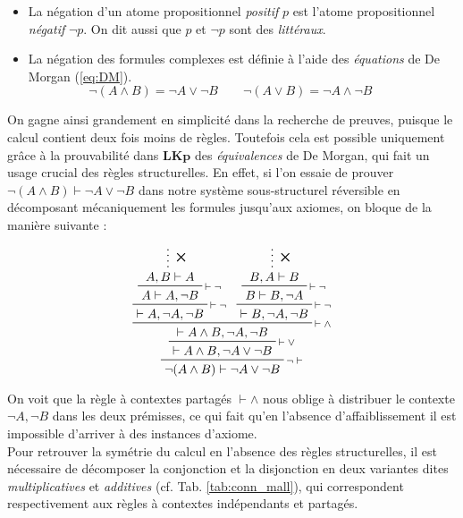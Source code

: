 \documentclass[12pt]{report}
\newcommand{\seq}{\vdash}
\newcommand{\irule}[1]{\footnotesize$#1$}
\newcommand{\iruleL}[1]{\irule{{#1}\seq}}
\newcommand{\iruleR}[1]{\irule{\seq{#1}}}
\begin{document}
\begin{itemize}
    \item La négation d'un atome propositionnel \emph{positif} $p$ est l'atome propositionnel \emph{négatif} $\neg p$. On dit aussi que $p$ et $\neg p$ sont des \emph{littéraux}.
    \item La négation des formules complexes est définie à l'aide des \emph{équations} de De Morgan (\ref{eq:DM}).
        \begin{equation} \label{eq:DM}
            \neg (A \land B) = \neg A \lor \neg B \qquad \neg (A \lor B) = \neg A \land \neg B \qquad
        \end{equation}
\end{itemize}

On gagne ainsi grandement en simplicité dans la recherche de preuves, puisque le calcul contient deux fois moins de règles. Toutefois cela est possible uniquement grâce à la prouvabilité dans $\mathbf{LKp}$ des \emph{équivalences} de De Morgan, qui fait un usage crucial des règles structurelles. En effet, si l'on essaie de prouver $\neg (A \land B) \seq \neg A \lor \neg B$ dans notre système sous-structurel réversible en décomposant mécaniquement les formules jusqu'aux axiomes, on bloque de la manière suivante :

\begin{displaymath}
    \prftree[r]{\iruleL{\neg}}
        {\prftree[r]{\iruleR{\lor}}
            {\prftree[r]{\iruleR{\land}}
                {\prftree[r]{\iruleR{\neg}}
                    {\prftree[r]{\iruleR{\neg}}
                        {\prfsummary[\ding{53}]{A,B \seq A}}
                        {A \seq A,\neg B}}
                    {\seq A,\neg A,\neg B}}
                {\prftree[r]{\iruleR{\neg}}
                    {\prftree[r]{\iruleR{\neg}}
                        {\prfsummary[\ding{53}]{B,A \seq B}}
                        {B \seq B,\neg A}}
                    {\seq B,\neg A,\neg B}}
                {\seq A \land B,\neg A,\neg B}}
            {\seq A \land B,\neg A \lor \neg B}}
        {\neg (A \land B) \seq \neg A \lor \neg B}
\end{displaymath}

On voit que la règle à contextes partagés {\iruleR{\land}} nous oblige à distribuer le contexte $\neg A,\neg B$ dans les deux prémisses, ce qui fait qu'en l'absence d'affaiblissement il est impossible d'arriver à des instances d'axiome.\\

Pour retrouver la symétrie du calcul en l'absence des règles structurelles, il est nécessaire de décomposer la conjonction et la disjonction en deux variantes dites \emph{multiplicatives} et \emph{additives} (cf. Tab. \ref{tab:conn_mall}), qui correspondent respectivement aux règles à contextes indépendants et partagés.
\end{document}
